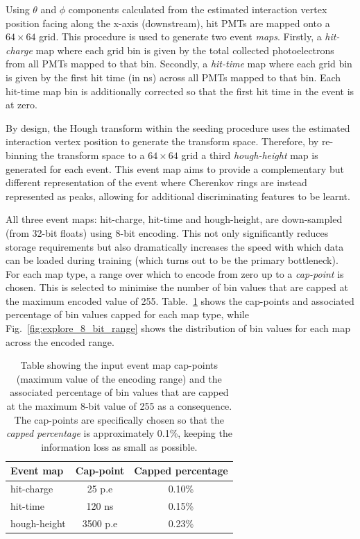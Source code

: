 Using $\theta$ and $\phi$ components calculated from the estimated interaction vertex position
facing along the x-axis (downstream), hit PMTs are mapped onto a $64 \times 64$ grid. This
procedure is used to generate two event \emph{maps}. Firstly, a \emph{hit-charge} map where each
grid bin is given by the total collected photoelectrons from all PMTs mapped to that bin.
Secondly, a \emph{hit-time} map where each grid bin is given by the first hit time (in ns) across
all PMTs mapped to that bin. Each hit-time map bin is additionally corrected so that the first hit
time in the event is at zero.

By design, the Hough transform within the seeding procedure uses the estimated interaction vertex
position to generate the transform space. Therefore, by re-binning the transform space to a $64
    \times 64$ grid a third \emph{hough-height} map is generated for each event. This event map aims
to provide a complementary but different representation of the event where Cherenkov rings are
instead represented as peaks, allowing for additional discriminating features to be learnt.

All three event maps: hit-charge, hit-time and hough-height, are down-sampled (from 32-bit floats)
using 8-bit encoding. This not only significantly reduces storage requirements but also
dramatically increases the speed with which data can be loaded during training (which turns out to
be the primary bottleneck). For each map type, a range over which to encode from zero up to a
\emph{cap-point} is chosen. This is selected to minimise the number of bin values that are capped
at the maximum encoded value of 255. Table.~\ref{tab:encoding} shows the cap-points and associated
percentage of bin values capped for each map type, while Fig.~\ref{fig:explore_8_bit_range} shows
the distribution of bin values for each map across the encoded range.

\begin{table}
    \begin{tabular}{lcc}
        Event map    & Cap-point & Capped percentage \\
        \midrule
        hit-charge   & 25 p.e    & 0.10\%            \\
        hit-time     & 120 ns    & 0.15\%            \\
        hough-height & 3500 p.e  & 0.23\%            \\
    \end{tabular}
    \caption[Table of input event map 8-bit cap-points]
    {Table showing the input event map cap-points (maximum value of the encoding range) and the
        associated percentage of bin values that are capped at the maximum 8-bit value of 255 as a
        consequence. The cap-points are specifically chosen so that the \emph{capped percentage}
        is approximately 0.1\%, keeping the information loss as small as possible.}
    \label{tab:encoding}
\end{table}

